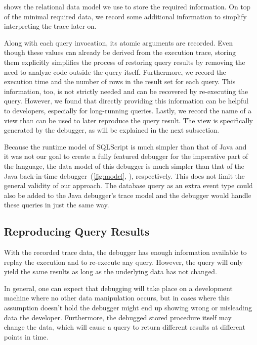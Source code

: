  shows the relational data model we use to store the required information.
On top of the minimal required data, we record some additional information to simplify interpreting the trace later on.

Along with each query invocation, its atomic arguments are recorded.
Even though these values can already be derived from the execution trace, storing them explicitly simplifies the process of restoring query results by removing the need to analyze code outside the query itself.
Furthermore, we record the execution time and the number of rows in the result set for each query.
This information, too, is not strictly needed and can be recovered by re-executing the query.
However, we found that directly providing this information can be helpful to developers, especially for long-running queries.
Lastly, we record the name of a view than can be used to later reproduce the query result.
The view is specifically generated by the debugger, as will be explained in the next subsection.

Because the runtime model of SQLScript is much simpler than that of Java and it was not our goal to create a fully featured debugger for the imperative part of the language, the data model of this debugger is much simpler than that of the Java back-in-time debugger~(\cf \cref{fig:model}, ), respectively.
This does not limit the general validity of our approach.
The database query as an extra event type could also be added to the Java debugger's trace model and the debugger would handle these queries in just the same way.

\subsection{Reproducing Query Results}

\tmpStart
With the recorded trace data, the debugger has enough information available to replay the execution and to re-execute any query.
However, the query will only yield the same results as long as the underlying data has not changed.

In general, one can expect that debugging will take place on a development machine where no other data manipulation occurs, 
but in cases where this assumption doesn't hold the debugger might end up showing wrong or misleading data the developer.
Furthermore, the debugged stored procedure itself may change the data, which will cause a query to return different results at different points in time.
\tmpEnd

